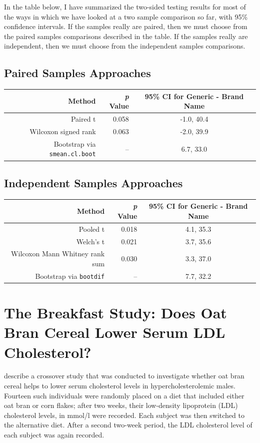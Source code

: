 \documentclass[
]{book}
\begin{document}
In the table below, I have summarized the two-sided testing results for most of the ways in which we have looked at a two sample comparison so far, with 95\% confidence intervals. If the samples really are paired, then we must choose from the paired samples comparisons described in the table. If the samples really are independent, then we must choose from the independent samples comparisons.

\hypertarget{paired-samples-approaches}{%
\subsection{Paired Samples Approaches}\label{paired-samples-approaches}}

\begin{longtable}[]{@{}rrc@{}}
\toprule
Method & \emph{p} Value & 95\% CI for Generic - Brand Name\tabularnewline
\midrule
\endhead
Paired t & 0.058 & -1.0, 40.4\tabularnewline
Wilcoxon signed rank & 0.063 & -2.0, 39.9\tabularnewline
Bootstrap via \texttt{smean.cl.boot} & -- & 6.7, 33.0\tabularnewline
\bottomrule
\end{longtable}

\hypertarget{independent-samples-approaches}{%
\subsection{Independent Samples Approaches}\label{independent-samples-approaches}}

\begin{longtable}[]{@{}rrc@{}}
\toprule
Method & \emph{p} Value & 95\% CI for Generic - Brand Name\tabularnewline
\midrule
\endhead
Pooled t & 0.018 & 4.1, 35.3\tabularnewline
Welch's t & 0.021 & 3.7, 35.6\tabularnewline
Wilcoxon Mann Whitney rank sum & 0.030 & 3.3, 37.0\tabularnewline
Bootstrap via \texttt{bootdif} & -- & 7.7, 32.2\tabularnewline
\bottomrule
\end{longtable}

\hypertarget{the-breakfast-study-does-oat-bran-cereal-lower-serum-ldl-cholesterol}{%
\section{The Breakfast Study: Does Oat Bran Cereal Lower Serum LDL Cholesterol?}\label{the-breakfast-study-does-oat-bran-cereal-lower-serum-ldl-cholesterol}}

\citet{Norman-Streiner} describe a crossover study that was conducted to investigate whether oat bran cereal helps to lower serum cholesterol levels in hypercholesterolemic males. Fourteen such individuals were randomly placed on a diet that included either oat bran or corn flakes; after two weeks, their low-density lipoprotein (LDL) cholesterol levels, in mmol/l were recorded. Each subject was then switched to the alternative diet. After a second two-week period, the LDL cholesterol level of each subject was again recorded.
\end{document}
